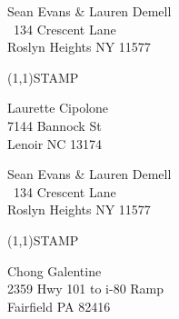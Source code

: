 \documentclass[12pt]{article}
\begin{document}
\clearpage

\begin{minipage}{.5\linewidth} \noindent
Sean Evans \& Lauren Demell\\\ 
134 Crescent Lane\\ 
Roslyn Heights NY 11577
\end{minipage}
\begin{minipage}{.5\linewidth \hspace{-.2in} \vspace{-.3in}}
\begin{flushright}
\framebox(1,1){STAMP}
\end{flushright}
\end{minipage}

\begin{center} \begin{Huge} \vspace*{\fill}
Laurette Cipolone\\
7144 Bannock St\\
Lenoir NC 13174\\
\vspace{\fill} \end{Huge} \end{center}

\clearpage

\begin{minipage}{.5\linewidth} \noindent
Sean Evans \& Lauren Demell\\\ 
134 Crescent Lane\\ 
Roslyn Heights NY 11577
\end{minipage}
\begin{minipage}{.5\linewidth \hspace{-.2in} \vspace{-.3in}}
\begin{flushright}
\framebox(1,1){STAMP}
\end{flushright}
\end{minipage}

\begin{center} \begin{Huge} \vspace*{\fill}
Chong Galentine\\
2359 Hwy 101 to i-80 Ramp\\
Fairfield PA 82416\\
\vspace{\fill} \end{Huge} \end{center}
\end{document}
